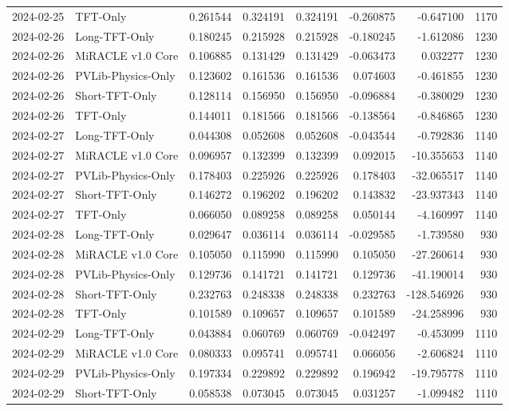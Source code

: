 \begin{tabular}{llrrrrrr}
2024-02-25 & TFT-Only & 0.261544 & 0.324191 & 0.324191 & -0.260875 & -0.647100 & 1170 \\
2024-02-26 & Long-TFT-Only & 0.180245 & 0.215928 & 0.215928 & -0.180245 & -1.612086 & 1230 \\
2024-02-26 & MiRACLE v1.0 Core & 0.106885 & 0.131429 & 0.131429 & -0.063473 & 0.032277 & 1230 \\
2024-02-26 & PVLib-Physics-Only & 0.123602 & 0.161536 & 0.161536 & 0.074603 & -0.461855 & 1230 \\
2024-02-26 & Short-TFT-Only & 0.128114 & 0.156950 & 0.156950 & -0.096884 & -0.380029 & 1230 \\
2024-02-26 & TFT-Only & 0.144011 & 0.181566 & 0.181566 & -0.138564 & -0.846865 & 1230 \\
2024-02-27 & Long-TFT-Only & 0.044308 & 0.052608 & 0.052608 & -0.043544 & -0.792836 & 1140 \\
2024-02-27 & MiRACLE v1.0 Core & 0.096957 & 0.132399 & 0.132399 & 0.092015 & -10.355653 & 1140 \\
2024-02-27 & PVLib-Physics-Only & 0.178403 & 0.225926 & 0.225926 & 0.178403 & -32.065517 & 1140 \\
2024-02-27 & Short-TFT-Only & 0.146272 & 0.196202 & 0.196202 & 0.143832 & -23.937343 & 1140 \\
2024-02-27 & TFT-Only & 0.066050 & 0.089258 & 0.089258 & 0.050144 & -4.160997 & 1140 \\
2024-02-28 & Long-TFT-Only & 0.029647 & 0.036114 & 0.036114 & -0.029585 & -1.739580 & 930 \\
2024-02-28 & MiRACLE v1.0 Core & 0.105050 & 0.115990 & 0.115990 & 0.105050 & -27.260614 & 930 \\
2024-02-28 & PVLib-Physics-Only & 0.129736 & 0.141721 & 0.141721 & 0.129736 & -41.190014 & 930 \\
2024-02-28 & Short-TFT-Only & 0.232763 & 0.248338 & 0.248338 & 0.232763 & -128.546926 & 930 \\
2024-02-28 & TFT-Only & 0.101589 & 0.109657 & 0.109657 & 0.101589 & -24.258996 & 930 \\
2024-02-29 & Long-TFT-Only & 0.043884 & 0.060769 & 0.060769 & -0.042497 & -0.453099 & 1110 \\
2024-02-29 & MiRACLE v1.0 Core & 0.080333 & 0.095741 & 0.095741 & 0.066056 & -2.606824 & 1110 \\
2024-02-29 & PVLib-Physics-Only & 0.197334 & 0.229892 & 0.229892 & 0.196942 & -19.795778 & 1110 \\
2024-02-29 & Short-TFT-Only & 0.058538 & 0.073045 & 0.073045 & 0.031257 & -1.099482 & 1110 \\

\end{tabular}
